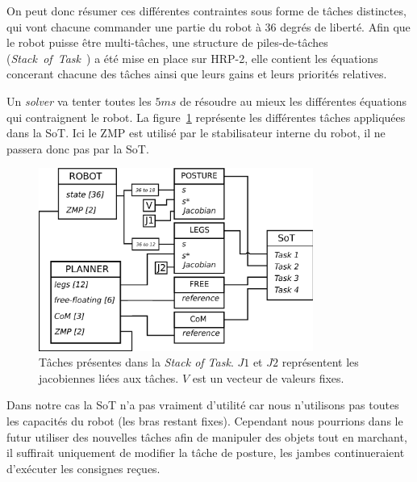 On peut donc résumer ces différentes contraintes sous forme de tâches distinctes, qui vont chacune commander une partie du robot à 36 degrés de liberté.
Afin que le robot puisse être multi-tâches, une structure de piles-de-tâches (\emph{Stack~of~Task}~\cite{mansard:ieeetro:2007}) a été mise en place sur HRP-2, elle contient les équations concerant chacune des tâches ainsi que leurs gains et leurs priorités relatives.

Un \emph{solver} va tenter toutes les $5ms$ de résoudre au mieux les différentes équations qui contraignent le robot. La figure~\ref{fig:sot} représente les différentes tâches appliquées dans la SoT. Ici le ZMP est utilisé par le stabilisateur interne du robot, il ne passera donc pas par la SoT.

\begin{figure}[h]
\begin{center}
\includegraphics[width=9.0cm]{images/SoT.png}
\caption{Tâches présentes dans la \emph{Stack of Task}. $J1$ et $J2$ représentent les jacobiennes liées aux tâches. $V$ est un vecteur de valeurs fixes.}
\label{fig:sot}
\end{center}
\end{figure}

Dans notre cas la SoT n'a pas vraiment d'utilité car nous n'utilisons pas toutes les capacités du robot (les bras restant fixes). Cependant nous pourrions dans le futur utiliser des nouvelles tâches afin de manipuler des objets tout en marchant, il suffirait uniquement de modifier la tâche de posture, les jambes continueraient d'exécuter les consignes reçues.

